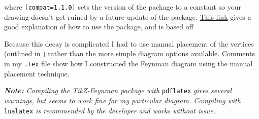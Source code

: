 \documentclass[12pt, letterpaper]{article}
\begin{document}
where {\tt [compat=1.1.0]} sets the version of the package to a constant so your drawing doesn't get ruined by a future update of the package. \href{https://www.overleaf.com/learn/latex/feynman\_diagrams}{This link} gives a good explanation of how to use the package, and is based off \citet[]{Ellis2016}

Because this decay is complicated I had to use manual placement of the vertices (outlined in \citet[Sec 2.4.3]{Ellis2016}) rather than the more simple diagram options available. Comments in my \texttt{.tex} file show how I constructed the Feynman diagram using the manual placement technique.

\vspace{4mm}
\noindent \emph{\textbf{Note:} Compiling the TikZ-Feynman package with} \texttt{pdflatex} \emph{gives several warnings, but seems to work fine for my particular diagram. Compiling with} \texttt{lualatex} \emph{is recommended by the developer and works without issue.}



\clearpage




\end{document}
